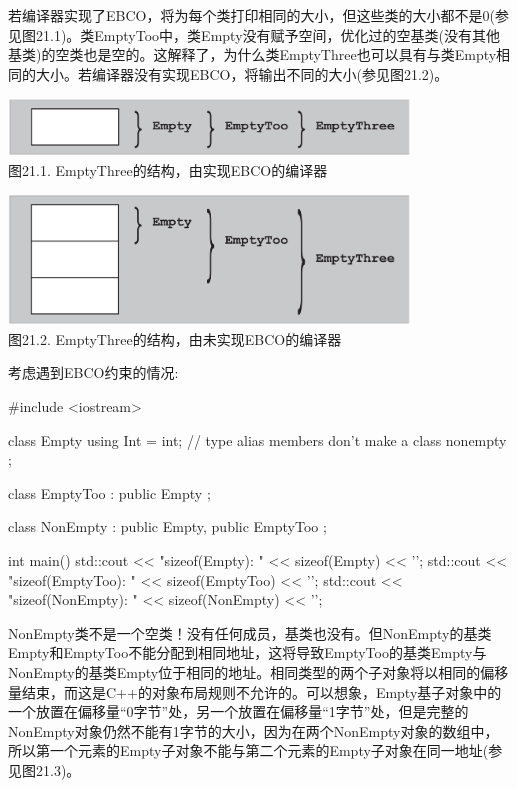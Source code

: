 若编译器实现了EBCO，将为每个类打印相同的大小，但这些类的大小都不是0(参见图21.1)。类EmptyToo中，类Empty没有赋予空间，优化过的空基类(没有其他基类)的空类也是空的。这解释了，为什么类EmptyThree也可以具有与类Empty相同的大小。若编译器没有实现EBCO，将输出不同的大小(参见图21.2)。

\begin{center}
\includegraphics[width=0.8\textwidth]{part3/ch21/images/1.png} \\
图21.1. EmptyThree的结构，由实现EBCO的编译器
\end{center}

\begin{center}
\includegraphics[width=0.8\textwidth]{part3/ch21/images/2.png} \\
图21.2. EmptyThree的结构，由未实现EBCO的编译器
\end{center}

考虑遇到EBCO约束的情况:

\begin{cpp}
#include <iostream>

class Empty {
	using Int = int; // type alias members don't make a class nonempty
};

class EmptyToo : public Empty {
};

class NonEmpty : public Empty, public EmptyToo {
};

int main()
{
	std::cout << "sizeof(Empty): " << sizeof(Empty) << '\n';
	std::cout << "sizeof(EmptyToo): " << sizeof(EmptyToo) << '\n';
	std::cout << "sizeof(NonEmpty): " << sizeof(NonEmpty) << '\n';
}
\end{cpp}

NonEmpty类不是一个空类！没有任何成员，基类也没有。但NonEmpty的基类Empty和EmptyToo不能分配到相同地址，这将导致EmptyToo的基类Empty与NonEmpty的基类Empty位于相同的地址。相同类型的两个子对象将以相同的偏移量结束，而这是C++的对象布局规则不允许的。可以想象，Empty基子对象中的一个放置在偏移量“0字节”处，另一个放置在偏移量“1字节”处，但是完整的NonEmpty对象仍然不能有1字节的大小，因为在两个NonEmpty对象的数组中，所以第一个元素的Empty子对象不能与第二个元素的Empty子对象在同一地址(参见图21.3)。

